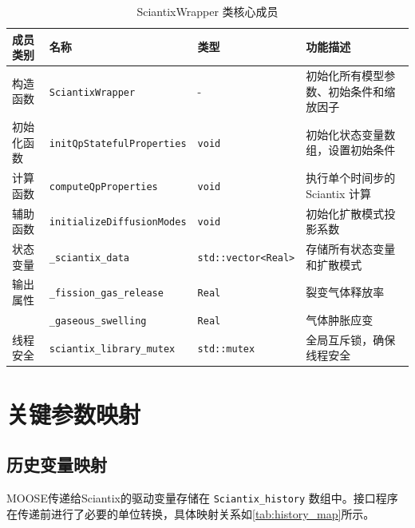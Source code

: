 \begin{table}[htbp]
	\centering
	\caption{SciantixWrapper 类核心成员}
	\label{tab:sciantix-class-members}
	\begin{tabularx}{\textwidth}{lllX} 
		\toprule
		成员类别 & 名称 & 类型 & 功能描述 \\
		\midrule
		构造函数 & \texttt{SciantixWrapper} & - & 初始化所有模型参数、初始条件和缩放因子 \\
		初始化函数 & \texttt{initQpStatefulProperties} & \texttt{void} & 初始化状态变量数组，设置初始条件 \\
		计算函数 & \texttt{computeQpProperties} & \texttt{void} & 执行单个时间步的 Sciantix 计算 \\
		辅助函数 & \texttt{initializeDiffusionModes} & \texttt{void} & 初始化扩散模式投影系数 \\
		状态变量 & \texttt{\_sciantix\_data} & \texttt{std::vector<Real>} & 存储所有状态变量和扩散模式 \\
		输出属性 & \texttt{\_fission\_gas\_release} & \texttt{Real} & 裂变气体释放率 \\
		& \texttt{\_gaseous\_swelling} & \texttt{Real} & 气体肿胀应变 \\
		线程安全 & \texttt{sciantix\_library\_mutex} & \texttt{std::mutex} & 全局互斥锁，确保线程安全 \\
		\bottomrule
	\end{tabularx}
\end{table}

\section{关键参数映射}

\subsection{历史变量映射}
MOOSE传递给Sciantix的驱动变量存储在 \texttt{Sciantix\_history} 数组中。接口程序在传递前进行了必要的单位转换，具体映射关系如\tablename\ref{tab:history_map}所示。

